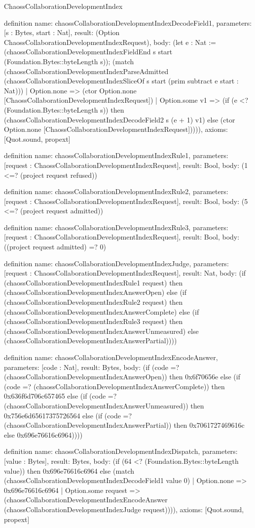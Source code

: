 \begin{lexlean}{ChaossCollaborationDevelopmentIndex}
\begin{semanticmodule}
definition{
  name: chaossCollaborationDevelopmentIndexDecodeField1,
  parameters: [s : Bytes, start : Nat],
  result: (Option ChaossCollaborationDevelopmentIndexRequest),
  body: (let e : Nat := (chaossCollaborationDevelopmentIndexFieldEnd s start (Foundation.Bytes::byteLength s)); (match (chaossCollaborationDevelopmentIndexParseAdmitted (chaossCollaborationDevelopmentIndexSliceOf s start (prim subtract e start : Nat)))
    | Option.none => (ctor Option.none [ChaossCollaborationDevelopmentIndexRequest])
    | Option.some v1 => (if (e <? (Foundation.Bytes::byteLength s)) then (chaossCollaborationDevelopmentIndexDecodeField2 s (e + 1) v1) else (ctor Option.none [ChaossCollaborationDevelopmentIndexRequest])))),
  axioms: [Quot.sound, propext]
}

definition{
  name: chaossCollaborationDevelopmentIndexRule1,
  parameters: [request : ChaossCollaborationDevelopmentIndexRequest],
  result: Bool,
  body: (1 <=? (project request refused))
}

definition{
  name: chaossCollaborationDevelopmentIndexRule2,
  parameters: [request : ChaossCollaborationDevelopmentIndexRequest],
  result: Bool,
  body: (5 <=? (project request admitted))
}

definition{
  name: chaossCollaborationDevelopmentIndexRule3,
  parameters: [request : ChaossCollaborationDevelopmentIndexRequest],
  result: Bool,
  body: ((project request admitted) =? 0)
}

definition{
  name: chaossCollaborationDevelopmentIndexJudge,
  parameters: [request : ChaossCollaborationDevelopmentIndexRequest],
  result: Nat,
  body: (if (chaossCollaborationDevelopmentIndexRule1 request) then (chaossCollaborationDevelopmentIndexAnswerOpen) else (if (chaossCollaborationDevelopmentIndexRule2 request) then (chaossCollaborationDevelopmentIndexAnswerComplete) else (if (chaossCollaborationDevelopmentIndexRule3 request) then (chaossCollaborationDevelopmentIndexAnswerUnmeasured) else (chaossCollaborationDevelopmentIndexAnswerPartial))))
}

definition{
  name: chaossCollaborationDevelopmentIndexEncodeAnswer,
  parameters: [code : Nat],
  result: Bytes,
  body: (if (code =? (chaossCollaborationDevelopmentIndexAnswerOpen)) then 0x6f70656e else (if (code =? (chaossCollaborationDevelopmentIndexAnswerComplete)) then 0x636f6d706c657465 else (if (code =? (chaossCollaborationDevelopmentIndexAnswerUnmeasured)) then 0x756e6d65617375726564 else (if (code =? (chaossCollaborationDevelopmentIndexAnswerPartial)) then 0x7061727469616c else 0x696e76616c6964))))
}

definition{
  name: chaossCollaborationDevelopmentIndexDispatch,
  parameters: [value : Bytes],
  result: Bytes,
  body: (if (64 <? (Foundation.Bytes::byteLength value)) then 0x696e76616c6964 else (match (chaossCollaborationDevelopmentIndexDecodeField1 value 0)
    | Option.none => 0x696e76616c6964
    | Option.some request => (chaossCollaborationDevelopmentIndexEncodeAnswer (chaossCollaborationDevelopmentIndexJudge request)))),
  axioms: [Quot.sound, propext]
}
\end{semanticmodule}
\end{lexlean}
